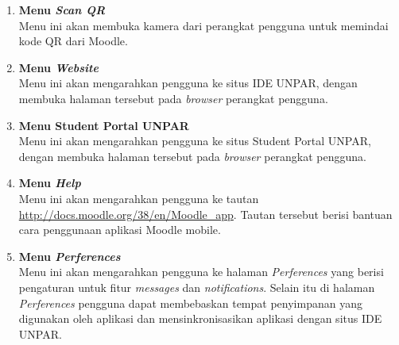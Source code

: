 \begin{enumerate}
 Pengguna juga dapat melihat file-file public dengan menekan \textit{dropdown} yang berada dibawah \textit{header} dan memilih site files. Halaman \textit{Site files} dapat dilihat pada Gambar \ref{app:menu:files:site}

\begin{figure}[H] 
	\centering  
	\texttt{[image: menu-files-site\_id.ac.unpar.moodlemobile.jpg]}  
	\caption[Halaman menu \textit{Site files} aplikasi] {Halaman menu \textit{Site files} aplikasi} 
	\label{app:menu:files:site} 
\end{figure}  

\item \textbf{Menu \textit{Scan QR}} \\
Menu ini akan membuka kamera dari perangkat pengguna untuk memindai kode QR dari Moodle.

\item \textbf{Menu \textit{Website}} \\
Menu ini akan mengarahkan pengguna ke situs IDE UNPAR, dengan membuka halaman tersebut pada \textit{browser} perangkat pengguna.

\item \textbf{Menu Student Portal UNPAR} \\
Menu ini akan mengarahkan pengguna ke situs Student Portal UNPAR, dengan membuka halaman tersebut pada \textit{browser} perangkat pengguna.

\item \textbf{Menu \textit{Help}} \\
Menu ini akan mengarahkan pengguna ke tautan \url{http://docs.moodle.org/38/en/Moodle\_app}. Tautan tersebut berisi bantuan cara penggunaan aplikasi Moodle mobile.

\item \textbf{Menu \textit{Perferences}} \\
Menu ini akan mengarahkan pengguna ke halaman \textit{Perferences} yang berisi pengaturan untuk fitur \textit{messages} dan \textit{notifications}. Selain itu di halaman \textit{Perferences} pengguna dapat membebaskan tempat penyimpanan yang digunakan oleh aplikasi dan mensinkronisasikan aplikasi dengan situs IDE UNPAR.


\end{enumerate}
